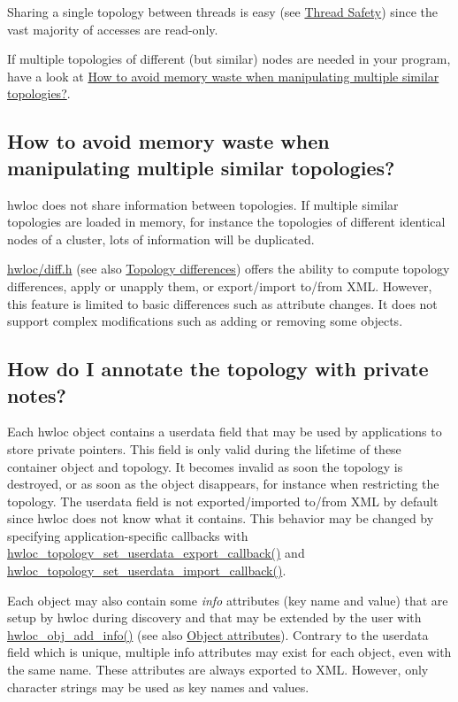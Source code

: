 Sharing a single topology between threads is easy (see \hyperlink{a00391}{Thread Safety}) since the vast majority of accesses are read-\/only.

If multiple topologies of different (but similar) nodes are needed in your program, have a look at \hyperlink{a00394_faq_diff}{How to avoid memory waste when manipulating multiple similar topologies?}.\hypertarget{a00394_faq_diff}{}\subsection{How to avoid memory waste when manipulating multiple similar topologies?}\label{a00394_faq_diff}
hwloc does not share information between topologies. If multiple similar topologies are loaded in memory, for instance the topologies of different identical nodes of a cluster, lots of information will be duplicated.

\hyperlink{a00170_source}{hwloc/diff.\+h} (see also \hyperlink{a00225}{Topology differences}) offers the ability to compute topology differences, apply or unapply them, or export/import to/from X\+ML. However, this feature is limited to basic differences such as attribute changes. It does not support complex modifications such as adding or removing some objects.\hypertarget{a00394_faq_annotate}{}\subsection{How do I annotate the topology with private notes?}\label{a00394_faq_annotate}
Each hwloc object contains a {\ttfamily userdata} field that may be used by applications to store private pointers. This field is only valid during the lifetime of these container object and topology. It becomes invalid as soon the topology is destroyed, or as soon as the object disappears, for instance when restricting the topology. The userdata field is not exported/imported to/from X\+ML by default since hwloc does not know what it contains. This behavior may be changed by specifying application-\/specific callbacks with {\ttfamily \hyperlink{a00206_ga9d6ff0f7a8dd45be9aa8575ef31978cc}{hwloc\+\_\+topology\+\_\+set\+\_\+userdata\+\_\+export\+\_\+callback()}} and {\ttfamily \hyperlink{a00206_ga5ac6917ea7289955fb1ffda4353af9b0}{hwloc\+\_\+topology\+\_\+set\+\_\+userdata\+\_\+import\+\_\+callback()}}.

Each object may also contain some {\itshape info} attributes (key name and value) that are setup by hwloc during discovery and that may be extended by the user with {\ttfamily \hyperlink{a00189_gace7654bb8a9002caae1a4b8a59e7452e}{hwloc\+\_\+obj\+\_\+add\+\_\+info()}} (see also \hyperlink{a00386}{Object attributes}). Contrary to the {\ttfamily userdata} field which is unique, multiple info attributes may exist for each object, even with the same name. These attributes are always exported to X\+ML. However, only character strings may be used as key names and values.

